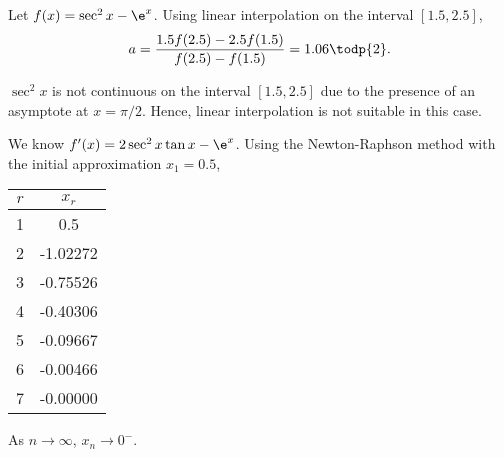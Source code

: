 \begin{solution}
\begin{ppart}
\begin{minipage}{0.45\textwidth}
\begin{center}
            \end{center}
        \end{minipage}
    \end{ppart}

    \begin{ppart}
        Let $f(x) = \sec^2 x - \e^x$. Using linear interpolation on the interval $[1.5, 2.5]$, \[a = \frac{1.5f(2.5)-2.5f(1.5)}{f(2.5) - f(1.5)} = 1.06 \todp{2}.\]

        $\sec^2{x}$ is not continuous on the interval $[1.5, 2.5]$ due to the presence of an asymptote at $x = \pi/2$. Hence, linear interpolation is not suitable in this case.
    \end{ppart}

    \begin{ppart}
        We know $f'(x) = 2\sec^2 x \tan x -\e^x$. Using the Newton-Raphson method with the initial approximation $x_1 = 0.5$,
        \begin{table}[H]
            \centering
            \begin{tabular}{|c|c|}
            \hline
            $r$ & $x_r$ \\ \hline
            1 & 0.5 \\ \hline
            2 & -1.02272 \\ \hline
            3 & -0.75526 \\ \hline
            4 & -0.40306 \\ \hline
            5 & -0.09667 \\ \hline
            6 & -0.00466 \\ \hline
            7 & -0.00000 \\ \hline
            \end{tabular}
        \end{table}
        As $n \to \infty$, $x_n \to 0^-$. 
        
        \begin{center}
\end{center}
\end{ppart}
\end{solution}
